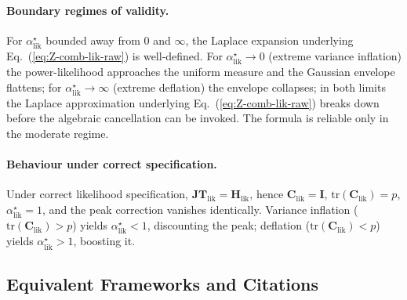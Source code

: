 \documentclass[11pt]{article}
\begin{document}
\paragraph{Boundary regimes of validity.}
For $\alpha^\star_{\mathrm{lik}}$ bounded away from $0$ and $\infty$, the Laplace expansion underlying Eq.~(\ref{eq:Z-comb-lik-raw}) is well-defined. For $\alpha^\star_{\mathrm{lik}} \to 0$ (extreme variance inflation) the power-likelihood approaches the uniform measure and the Gaussian envelope flattens; for $\alpha^\star_{\mathrm{lik}} \to \infty$ (extreme deflation) the envelope collapses; in both limits the Laplace approximation underlying Eq.~(\ref{eq:Z-comb-lik-raw}) breaks down before the algebraic cancellation can be invoked. The formula is reliable only in the moderate regime.

\paragraph{Behaviour under correct specification.}
Under correct likelihood specification, $\mathbf{JT}_{\mathrm{lik}} = \mathbf H_{\mathrm{lik}}$, hence $\mathbf C_{\mathrm{lik}} = \mathbf I$, $\mathrm{tr}(\mathbf C_{\mathrm{lik}}) = p$, $\alpha^\star_{\mathrm{lik}} = 1$, and the peak correction vanishes identically. Variance inflation ($\mathrm{tr}(\mathbf C_{\mathrm{lik}}) > p$) yields $\alpha^\star_{\mathrm{lik}} < 1$, discounting the peak; deflation ($\mathrm{tr}(\mathbf C_{\mathrm{lik}}) < p$) yields $\alpha^\star_{\mathrm{lik}} > 1$, boosting it.

\subsection{Equivalent Frameworks and Citations}
\label{sec:equiv-frameworks-lik}
\end{document}
